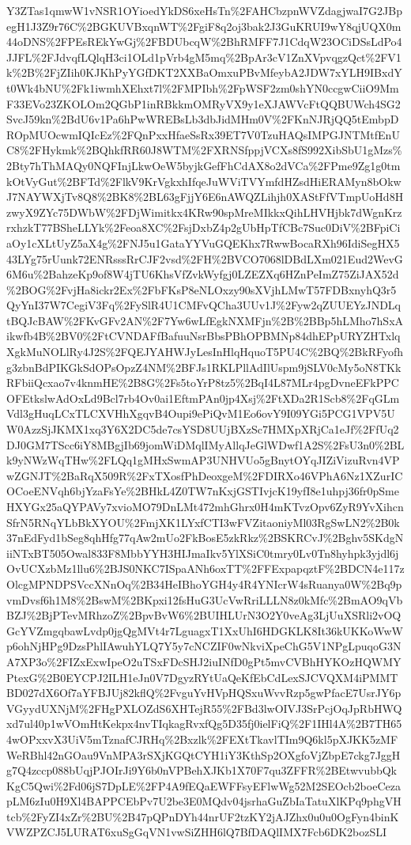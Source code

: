 \documentclass[11pt]{article}
\begin{document}
Y3ZTas1qmwW1vNSR1OYioedYkDS6xeHsTn\%2FAHCbzpnWVZdagjwaI7G2JBpegH1J3Z9r76C\%2BGKUVBxqnWT\%2FgiF8q2oj3bak2J3GuKRUI9wY8qjUQX0m44oDNS\%2FPEsREkYwGj\%2FBDUbcqW\%2BhRMFF7J1CdqW23OCiDSsLdPo4JJFL\%2FJdvqfLQlqH3ci1OLd1pVrb4gM5mq\%2BpAr3cV1ZnXVpvqgzQct\%2FV1k\%2B\%2FjZIih0KJKhPyYGfDKT2XXBaOmxuPBvMfeybA2JDW7xYLH9IBxdYt0Wk4bNU\%2Fk1iwmhXEhxt7l\%2FMPIbh\%2FpWSF2zm0shYN0ccgwCiiO9MmF33EVo23ZKOLOm2QGbP1inRBkkmOMRyVX9y1eXJAWVcFtQQBUWch4SG2SvcJ59kn\%2BdU6v1Pa6hPwWREBsLb3dbJidMHm0V\%2FKnNJRjQQ5tEmbpDROpMUOcwmIQIcEz\%2FQnPxxHfaeSsRx39ET7V0TzuHAQsIMPGJNTMtfEnUC8\%2FHykmk\%2BQhkfRR60J8WTM\%2FXRNSfppjVCXs8fS992XibSbU1gMzs\%2Bty7hThMAQy0NQFInjLkwOeW5byjkGefFhCdAX8o2dVCa\%2FPme9Zg1g0tmkOtVyGut\%2BFTd\%2FlkV9KrVgkxhIfqeJuWViTVYmfdHZsdHiERAMyn8bOkwJ7NAYWXjTv8Q8\%2BK8\%2BL63gFjjY6E6nAWQZLihjh0XAStFfVTmpUoHd8HzwyX9ZYc75DWbW\%2FDjWimitkx4KRw90spMreMIkkxQihLHVHjbk7dWgnKrzrxhzkT77BSheLLYk\%2Feoa8XC\%2FsjDxbZ4p2gUbHpTfCBc7Suc0DiV\%2BFpiCiaOy1cXLtUyZ5aX4g\%2FNJ5u1GataYYVuGQEKhx7RwwBocaRXh96IdiSegHX543LYg75rUunk72ENRsssRrCJF2vsd\%2FH\%2BVCO7068lDBdLXm021Eud2WevG6M6u\%2BahzeKp9of8W4jTU6KhsVfZvkWyfgj0LZEZXq6HZnPeImZ75ZiJAX52d\%2BOG\%2FvjHa8ickr2Ex\%2FbFKsP8eNLOxzy90sXVjhLMwT57FDBxnyhQ3r5QyYnI37W7CegiV3Fq\%2FySlR4U1CMFvQCha3UUv1J\%2Fyw2qZUUEYzJNDLqtBQJcBAW\%2FKvGFv2AN\%2F7Yw6wLfEgkNXMFjn\%2B\%2BBp5hLMho7hSxAikwfb4B\%2BV0\%2FtCVNDAFfBafuuNsrBbsPBhOPBMNp84dhEPpURYZHTxlqXgkMuNOLlRy4J2S\%2FQEJYAHWJyLesInHlqHquoT5PU4C\%2BQ\%2BkRFyofhg3zbnBdPIKGkSdOPsOpzZ4NM\%2BFJs1RKLPllAdIlUspm9jSLV0cMy5oN8TKkRFbiiQcxao7v4knmHE\%2B8G\%2Fs5toYrP8tz5\%2BqI4L87MLr4pgDvneEFkPPCOFEtkslwAdOxLd9Bcl7rb4Ov0ai1EftmPAn0jp4Xsj\%2FtXDa2R1Scb8\%2FqGLmVdl3gHuqLCxTLCXVHhXgqvB4Oupi9ePiQvM1Eo6ovY9I09YGi5PCG1VPV5UW0AzzSjJKMX1xq3Y6X2DC5de7csYSD8UUjBXzSc7HMXpXRjCa1eJf\%2FfUq2DJ0GM7TScc6iY8MBgjIb69jomWiDMqlIMyAllqJeGlWDwf1A2S\%2FsU3n0\%2BLk9yNWzWqTHw\%2FLQq1gMHxSwmAP3UNHVUo5gBnytOYqJIZiVizuRvn4VPwZGNJT\%2BaRqX509R\%2FxTXosfPhDeoxgeM\%2FDIRXo46VPhA6Nz1XZurICOCoeENVqh6bjYzaFsYe\%2BHkL4Z0TW7nKxjGSTIvjcK19yfI8e1uhpj36fr0pSmeHXYGx25aQYPAVy7xvioMO79DnLMt472mhGhrx0H4mKTvzOpv6ZyR9YvXihcnSfrN5RNqYLbBkXYOU\%2FmjXK1LYxfCTI3wFVZitaoniyMl03RgSwLN2\%2B0k37nEdFyd1bSeg8qhHfg77qAw2mUo2FkBosE5zkRkz\%2BSKRCvJ\%2Bghv5SKdgNiiNTxBT505Owal833F8MbbYYH3HIJmaIkv5YlXSiC0tmry0Lv0Tn8hyhpk3yjdl6jOvUCXzbMz1llu6\%2BJS0NKC7ISpaANh6oxTT\%2FFExpapqztF\%2BDCN4e117zOlcgMPNDPSVccXNnOq\%2B34HeIBhoYGH4y4R4YNIcrW4sRuanya0W\%2Bq9pvmDvsf6h1M8\%2BswM\%2BKpxi12fsHuG3UcVwRriLLLN8z0kMfc\%2BmAO9qVbBZJ\%2BjPTevMRhzoZ\%2BpvBvW6\%2BUIHLUrN3O2Y0veAg3LjUuXSRli2vOQGcYVZmgqbawLvdp0jgQgMVt4r7LguagxT1XxUhI6HDGKLK8It36kUKKoWwWp6ohNjHPg9DzsPhlIAwuhYLQ7Y5y7cNCZIF0wNkviXpeChG5V1NPgLpuqoG3NA7XP3o\%2FIZxExwIpeO2uTSxFDcSHJ2iuINfD0gPt5mvCVBhHYKOzHQWMYPtexG\%2B0EYCPJ2ILH1eJn0V7DgyzRYtUaQeKfEbCdLexSJCVQXM4iPMMTBD027dX6Of7aYFBJUj82kflQ\%2FvguYvHVpHQSxuWvvRzp5gwPfacE7UsrJY6pVGyydUXNjM\%2FHgPXLOZdS6XHTejR55\%2FBd3lwOIVJ3SrPcjOqJpRbHWQxd7ul40p1wVOmHtKekpx4nvTIqkagRvxfQg5D35fj0ielFiQ\%2F1IHl4A\%2B7TH654wOPxxvX3UiV5mTznafCJRHq\%2Bxzlk\%2FEXtTkavlTIm9Q6kl5pXJKK5zMFWeRBhl42nGOau9VnMPA3rSXjKGQtCYH1iY3KthSp2OXgfoVjZbpE7ckg7JggHg7Q4zccp088bUqjPJOIrJi9Y6b0nVPBehXJKb1X70F7qu3ZFFR\%2BEtwvubbQkKgC5Qwi\%2Fd06jS7DpLE\%2FP4A9fEQaEWFFsyEFlwWg52M2SEOcb2boeCezapLM6zIu0H9Xl4BAPPCEbPv7U2be3E0MQdv04jsrhaGuZbIaTatuXlKPq9phgVHtcb\%2FyZI4xZr\%2BU\%2B47pQPnDYh44nrUF2tzKY2jAJZhx0u0u0OgFyn4binKVWZPZCJ5LURAT6xuSgGqVN1vwSiZHH6lQ7BfDAQlIMX7Fcb6DK2bozSLI
\end{document}
